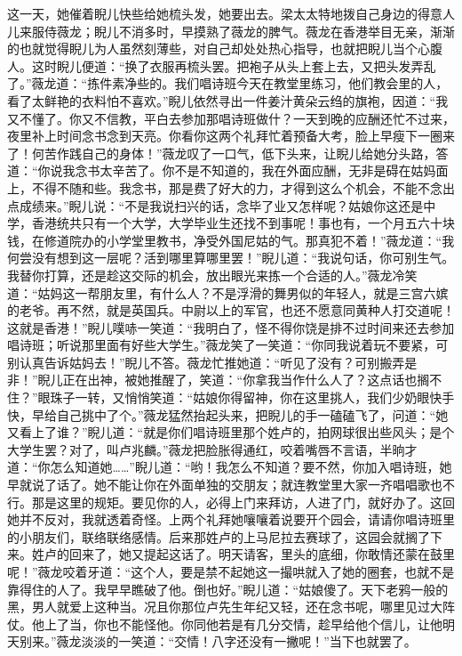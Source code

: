 \par 这一天，她催着睨儿快些给她梳头发，她要出去。梁太太特地拨自己身边的得意人儿来服侍薇龙；睨儿不消多时，早摸熟了薇龙的脾气。薇龙在香港举目无亲，渐渐的也就觉得睨儿为人虽然刻薄些，对自己却处处热心指导，也就把睨儿当个心腹人。这时睨儿便道：“换了衣服再梳头罢。把袍子从头上套上去，又把头发弄乱了。”薇龙道：“拣件素净些的。我们唱诗班今天在教堂里练习，他们教会里的人，看了太鲜艳的衣料怕不喜欢。”睨儿依然寻出一件姜汁黄朵云绉的旗袍，因道：“我又不懂了。你又不信教，平白去参加那唱诗班做什？一天到晚的应酬还忙不过来，夜里补上时间念书念到天亮。你看你这两个礼拜忙着预备大考，脸上早瘦下一圈来了！何苦作践自己的身体！”薇龙叹了一口气，低下头来，让睨儿给她分头路，答道：“你说我念书太辛苦了。你不是不知道的，我在外面应酬，无非是碍在姑妈面上，不得不随和些。我念书，那是费了好大的力，才得到这么个机会，不能不念出点成绩来。”睨儿说：“不是我说扫兴的话，念毕了业又怎样呢？姑娘你这还是中学，香港统共只有一个大学，大学毕业生还找不到事呢！事也有，一个月五六十块钱，在修道院办的小学堂里教书，净受外国尼姑的气。那真犯不着！”薇龙道：“我何尝没有想到这一层呢？活到哪里算哪里罢！”睨儿道：“我说句话，你可别生气。我替你打算，还是趁这交际的机会，放出眼光来拣一个合适的人。”薇龙冷笑道：“姑妈这一帮朋友里，有什么人？不是浮滑的舞男似的年轻人，就是三宫六嫔的老爷。再不然，就是英国兵。中尉以上的军官，也还不愿意同黄种人打交道呢！这就是香港！”睨儿噗哧一笑道：“我明白了，怪不得你饶是排不过时间来还去参加唱诗班；听说那里面有好些大学生。”薇龙笑了一笑道：“你同我说着玩不要紧，可别认真告诉姑妈去！”睨儿不答。薇龙忙推她道：“听见了没有？可别搬弄是非！”睨儿正在出神，被她推醒了，笑道：“你拿我当作什么人了？这点话也搁不住？”眼珠子一转，又悄悄笑道：“姑娘你得留神，你在这里挑人，我们少奶眼快手快，早给自己挑中了个。”薇龙猛然抬起头来，把睨儿的手一磕磕飞了，问道：“她又看上了谁？”睨儿道：“就是你们唱诗班里那个姓卢的，拍网球很出些风头；是个大学生罢？对了，叫卢兆麟。”薇龙把脸胀得通红，咬着嘴唇不言语，半晌才道：“你怎么知道她……”睨儿道：“哟！我怎么不知道？要不然，你加入唱诗班，她早就说了话了。她不能让你在外面单独的交朋友；就连教堂里大家一齐唱唱歌也不行。那是这里的规矩。要见你的人，必得上门来拜访，人进了门，就好办了。这回她并不反对，我就透着奇怪。上两个礼拜她嚷嚷着说要开个园会，请请你唱诗班里的小朋友们，联络联络感情。后来那姓卢的上马尼拉去赛球了，这园会就搁了下来。姓卢的回来了，她又提起这话了。明天请客，里头的底细，你敢情还蒙在鼓里呢！”薇龙咬着牙道：“这个人，要是禁不起她这一撮哄就入了她的圈套，也就不是靠得住的人了。我早早瞧破了他。倒也好。”睨儿道：“姑娘傻了。天下老鸦一般的黑，男人就爱上这种当。况且你那位卢先生年纪又轻，还在念书呢，哪里见过大阵仗。他上了当，你也不能怪他。你同他若是有几分交情，趁早给他个信儿，让他明天别来。”薇龙淡淡的一笑道：“交情！八字还没有一撇呢！”当下也就罢了。
